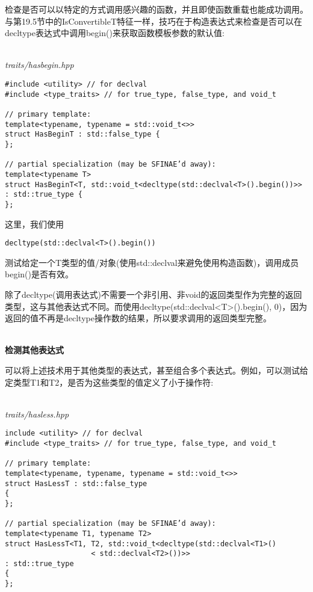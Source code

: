 检查是否可以以特定的方式调用感兴趣的函数，并且即使函数重载也能成功调用。与第19.5节中的IsConvertibleT特征一样，技巧在于构造表达式来检查是否可以在decltype表达式中调用begin()来获取函数模板参数的默认值:

\hspace*{\fill} \\ %
\noindent
\textit{traits/hasbegin.hpp}
\begin{lstlisting}[style=styleCXX]
#include <utility> // for declval
#include <type_traits> // for true_type, false_type, and void_t

// primary template:
template<typename, typename = std::void_t<>>
struct HasBeginT : std::false_type {
};

// partial specialization (may be SFINAE’d away):
template<typename T>
struct HasBeginT<T, std::void_t<decltype(std::declval<T>().begin())>>
: std::true_type {
};
\end{lstlisting}

这里，我们使用

\begin{lstlisting}[style=styleCXX]
decltype(std::declval<T>().begin())
\end{lstlisting}

测试给定一个T类型的值/对象(使用std::declval来避免使用构造函数)，调用成员begin()是否有效。

\begin{tcolorbox}[colback=webgreen!5!white,colframe=webgreen!75!black]
\hspace*{0.75cm}除了decltype(调用表达式)不需要一个非引用、非void的返回类型作为完整的返回类型，这与其他表达式不同。而使用decltype(std::declval<T>().begin(), 0)，因为返回的值不再是decltype操作数的结果，所以要求调用的返回类型完整。
\end{tcolorbox}

\hspace*{\fill} \\ %
\noindent
\textbf{检测其他表达式}

可以将上述技术用于其他类型的表达式，甚至组合多个表达式。例如，可以测试给定类型T1和T2，是否为这些类型的值定义了小于操作符:

\hspace*{\fill} \\ %
\noindent
\textit{traits/hasless.hpp}
\begin{lstlisting}[style=styleCXX]
include <utility> // for declval
#include <type_traits> // for true_type, false_type, and void_t

// primary template:
template<typename, typename, typename = std::void_t<>>
struct HasLessT : std::false_type
{
};

// partial specialization (may be SFINAE’d away):
template<typename T1, typename T2>
struct HasLessT<T1, T2, std::void_t<decltype(std::declval<T1>()
					< std::declval<T2>())>>
: std::true_type
{
};
\end{lstlisting}

